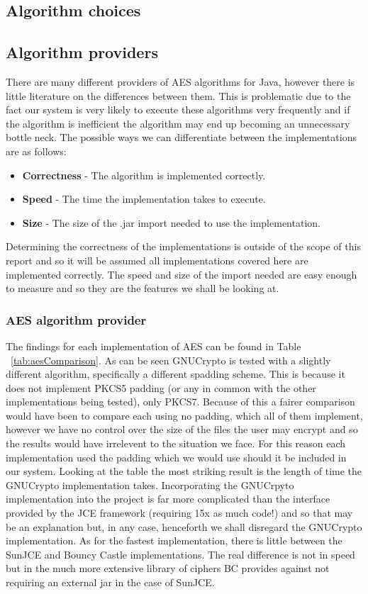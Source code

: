 \documentclass[10pt, titlepage]{article}
\begin{document}
\subsection{Algorithm choices}

\subsection*{Algorithm providers}
There are many different providers of AES algorithms for Java, however there is little literature on the differences between them. This is problematic due to the fact our system is very likely to execute these algorithms very frequently and if the algorithm is inefficient the algorithm may end up becoming an unnecessary bottle neck. The possible ways we can differentiate between the implementations are as follows:
\begin{itemize}
	\item \textbf{Correctness} - The algorithm is implemented correctly.
	\item \textbf{Speed} - The time the implementation takes to execute.
	\item \textbf{Size} - The size of the .jar import needed to use the implementation.
\end{itemize}
Determining the correctness of the implementations is outside of the scope of this report and so it will be assumed all implementations covered here are implemented correctly. The speed and size of the import needed are easy enough to measure and so they are the features we shall be looking at.

\subsubsection*{AES algorithm provider}
\newline The findings for each implementation of AES can be found in Table ~\ref{tab:aesComparison}. As can be seen GNUCrypto is tested with a slightly different algorithm, specifically a different spadding scheme. This is because it does not implement PKCS5 padding (or any in common with the other implementations being tested), only PKCS7. Because of this a fairer comparison would have been to compare each using no padding, which all of them implement, however we have no control over the size of the files the user may encrypt and so the results would have irrelevent to the situation we face. For this reason each implementation used the padding which we would use should it be included in our system. Looking at the table the most striking result is the length of time the GNUCrypto implementation takes. Incorporating the GNUCrpyto implementation into the project is far more complicated than the interface provided by the JCE framework (requiring 15x as much code!) and so that may be an explanation but, in any case, henceforth we shall disregard the GNUCrypto implementation. As for the fastest implementation, there is little between the SunJCE and Bouncy Castle implementations. The real difference is not in speed but in the much more extensive library of ciphers BC provides against not requiring an external jar in the case of SunJCE.
\end{document}

